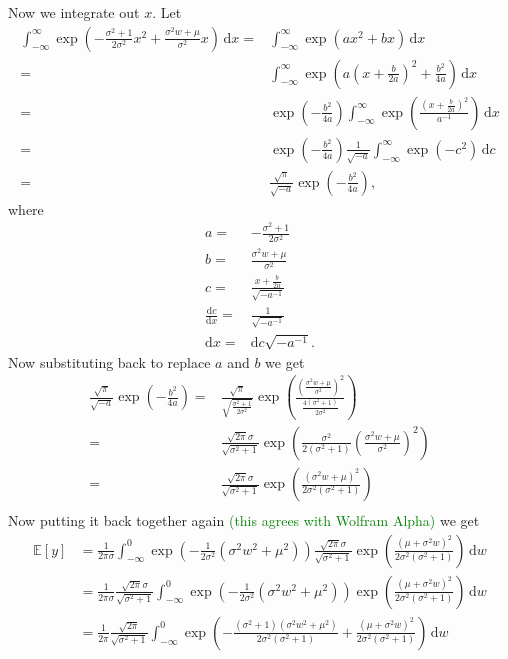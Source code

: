 \documentclass[]{article}
\newcommand{\dean}[1]{\textcolor{green}{#1}}
\begin{document}
Now we integrate out $x$. Let
\begin{align}
	\int_{-\infty}^{\infty}\exp\left(-\frac{\sigma^2 +1}{2\sigma^2}x^2 + \frac{\sigma^2w+\mu}{\sigma^2}x\right)\,\mathrm{d}x =& \int_{-\infty}^{\infty}\exp\left(ax^2+bx\right)\,\mathrm{d}x \\
	=& \int_{-\infty}^{\infty}\exp\left(a\left(x+\frac{b}{2a}\right)^2 + \frac{b^2}{4a} \right)\,\mathrm{d}x \\
	=& \exp\left(- \frac{b^2}{4a}\right)\int_{-\infty}^{\infty}\exp\left(\frac{\left(x+\frac{b}{2a}\right)^2}{a^{-1}}  \right)\,\mathrm{d}x \\
	=& \exp\left(- \frac{b^2}{4a}\right)\frac{1}{\sqrt{-a}}\int_{-\infty}^{\infty}\exp\left(-c^2\right)\,\mathrm{d}c \\
	=& \frac{\sqrt{\pi}}{\sqrt{-a}}\exp\left(-\frac{b^2}{4a}\right),
\end{align}
where
\begin{align}
	a =& -\frac{\sigma^2 + 1}{2\sigma^2} \\
	b =& \frac{\sigma^2w + \mu}{\sigma^2} \\
	c =& \frac{x+\frac{b}{2a}}{\sqrt{-a^{-1}}} \\
	\frac{\mathrm{d}c}{\mathrm{d}x} =& \frac{1}{\sqrt{-a^{-1}}} \\
	\mathrm{d}x =& \mathrm{d}c \sqrt{-a^{-1}}.
\end{align}
Now substituting back to replace $a$ and $b$ we get
\begin{align}
	\frac{\sqrt{\pi}}{\sqrt{-a}}\exp\left(-\frac{b^2}{4a}\right) =& \frac{\sqrt{\pi}}{\sqrt{\frac{\sigma^2 + 1}{2\sigma^2}}}\exp\left(\frac{\left(\frac{\sigma^2w + \mu}{\sigma^2}\right)^2}{\frac{4(\sigma^2 + 1)}{2\sigma^2}}\right) \\
	=& \frac{\sqrt{2\pi}\sigma}{\sqrt{\sigma^2 + 1}}\exp\left(\frac{\sigma^2}{2(\sigma^2 + 1)}\left(\frac{\sigma^2w + \mu}{\sigma^2}\right)^2\right) \\
	=& \frac{\sqrt{2\pi}\sigma}{\sqrt{\sigma^2 + 1}}\exp\left(\frac{\left(\sigma^2w + \mu\right)^2}{2\sigma^2(\sigma^2 + 1)}\right) \\
\end{align}
Now putting it back together again \dean{(this agrees with Wolfram Alpha)} we get
\begin{align}
\mathbb{E}\left[y\right] &=\frac{1}{2\pi\sigma} \int_{-\infty}^{0} \exp\left(-\frac{1}{2\sigma^2} \left(\sigma^2w^2 +  \mu^2\right)\right)\frac{\sqrt{2\pi}\sigma}{\sqrt{\sigma^2+1}}\exp\left(\frac{\left(\mu + \sigma^2 w\right)^2}{2\sigma^2\left(\sigma^2 + 1\right)}\right) \,\mathrm{d}w \\
&=\frac{1}{2\pi\sigma}\frac{\sqrt{2\pi}\sigma}{\sqrt{\sigma^2+1}}\int_{-\infty}^{0} \exp\left(-\frac{1}{2\sigma^2}\left(\sigma^2w^2 +  \mu^2\right)\right)\exp\left(\frac{\left(\mu + \sigma^2w\right)^2}{2\sigma^2\left(\sigma^2+1\right)}\right) \,\mathrm{d}w \\
&=\frac{1}{2\pi}\frac{\sqrt{2\pi}}{\sqrt{\sigma^2+1}}\int_{-\infty}^{0} \exp\left(-\frac{\left(\sigma^2+1\right)\left(\sigma^2w^2 +  \mu^2\right)}{2\sigma^2\left(\sigma^2+1\right)}+\frac{\left(\mu+\sigma^2w\right)^2}{2\sigma^2\left(\sigma^2+1\right)}\right) \,\mathrm{d}w 
\end{align}
\end{document}
